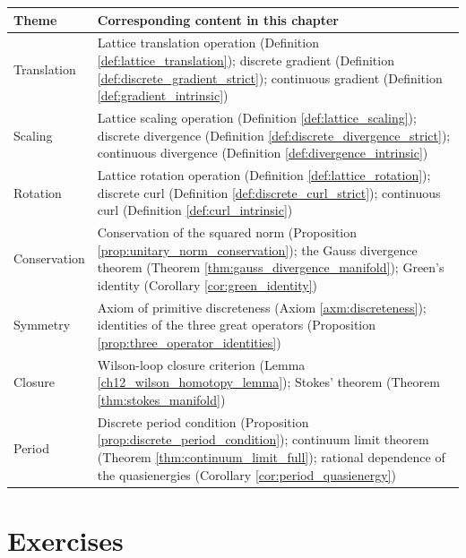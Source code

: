 \begin{center}
\renewcommand{\arraystretch}{1.3}
\begin{tabular}{>{\raggedright\arraybackslash}p{2.8cm}>{\raggedright\arraybackslash}p{9.9cm}}
\toprule
Theme & Corresponding content in this chapter \\
\midrule
Translation & Lattice translation operation (Definition \ref{def:lattice_translation}); discrete gradient (Definition \ref{def:discrete_gradient_strict}); continuous gradient (Definition \ref{def:gradient_intrinsic}) \\
Scaling & Lattice scaling operation (Definition \ref{def:lattice_scaling}); discrete divergence (Definition \ref{def:discrete_divergence_strict}); continuous divergence (Definition \ref{def:divergence_intrinsic}) \\
Rotation & Lattice rotation operation (Definition \ref{def:lattice_rotation}); discrete curl (Definition \ref{def:discrete_curl_strict}); continuous curl (Definition \ref{def:curl_intrinsic}) \\
Conservation & Conservation of the squared norm (Proposition \ref{prop:unitary_norm_conservation}); the Gauss divergence theorem (Theorem \ref{thm:gauss_divergence_manifold}); Green's identity (Corollary \ref{cor:green_identity}) \\
Symmetry & Axiom of primitive discreteness (Axiom \ref{axm:discreteness}); identities of the three great operators (Proposition \ref{prop:three_operator_identities}) \\
Closure & Wilson-loop closure criterion (Lemma \ref{ch12_wilson_homotopy_lemma}); Stokes' theorem (Theorem \ref{thm:stokes_manifold}) \\
Period & Discrete period condition (Proposition \ref{prop:discrete_period_condition}); continuum limit theorem (Theorem \ref{thm:continuum_limit_full}); rational dependence of the quasienergies (Corollary \ref{cor:period_quasienergy}) \\
\bottomrule
\end{tabular}
\end{center}

\section*{Exercises}

